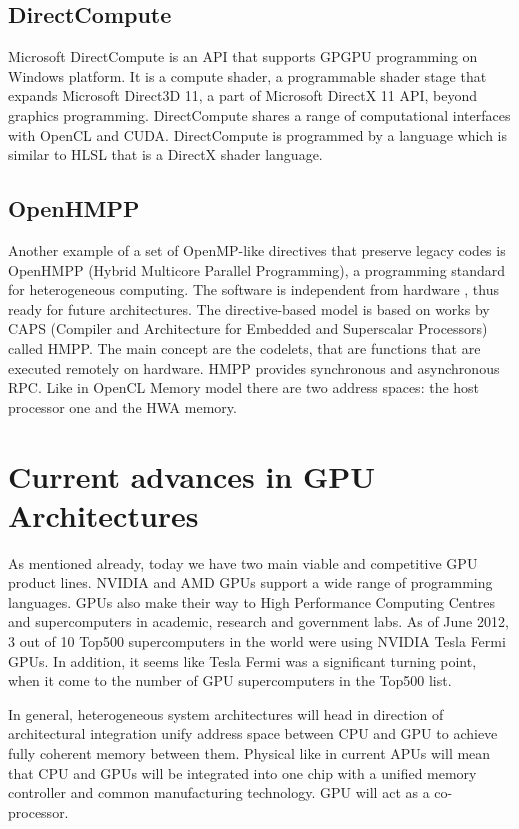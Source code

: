 \subsection{DirectCompute}
Microsoft DirectCompute is an API that supports GPGPU programming on Windows platform.\cite{microsoft2012direct} It is a compute shader, a programmable shader stage that expands Microsoft Direct3D 11, a part of Microsoft DirectX 11 API, beyond graphics programming. DirectCompute shares a range of computational interfaces  with OpenCL and CUDA. DirectCompute is programmed by a language which is similar to HLSL that is a DirectX shader language.

\subsection{OpenHMPP}
Another example of a set of OpenMP-like directives that preserve legacy codes is OpenHMPP (Hybrid Multicore Parallel Programming), a programming standard for heterogeneous computing.\cite{openhmpp2012, caps2012hmpp} The software is independent from hardware , thus ready for future architectures. The directive-based model is based on works by CAPS (Compiler and Architecture for Embedded and Superscalar Processors) called HMPP. The main concept are the codelets, that are functions that are executed remotely on hardware. HMPP provides synchronous and asynchronous RPC. Like in OpenCL Memory model there are two address spaces: the host processor one and the HWA memory.

\section{Current advances in GPU Architectures}
As mentioned already, today we have two main viable and competitive GPU product lines. NVIDIA and AMD GPUs support a wide range of programming languages. GPUs also make their way to High Performance Computing Centres and supercomputers in academic, research and government labs.\cite{nvidia2012super, nvidia2012super2} As of June 2012, 3 out of 10 Top500 supercomputers in the world were using NVIDIA Tesla Fermi GPUs.\cite{top5002012} In addition, it seems like Tesla Fermi was a significant turning point, when it come to the number of GPU supercomputers in the Top500 list.

In general, heterogeneous system architectures will head in direction of architectural integration unify address space between CPU and GPU to achieve fully coherent memory between them. Physical like in current APUs will mean that CPU and GPUs will be integrated into one chip with a unified memory controller and common manufacturing technology. \cite{amd2012hipeac} GPU will act as a co-processor.

